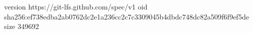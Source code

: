 version https://git-lfs.github.com/spec/v1
oid sha256:ef738edba2ab0762dc2e1a236cc2c7c3309045b4dbdc748dc82a509f6f9ef5de
size 349692

